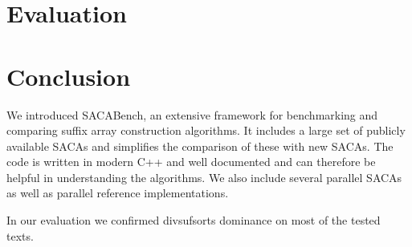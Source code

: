 \section{Evaluation}



\section{Conclusion}

We introduced SACABench, an extensive framework for benchmarking and comparing suffix array construction algorithms.
It includes a large set of publicly available SACAs and simplifies the comparison of these with new SACAs.
The code is written in modern C++ and well documented and can therefore be helpful in understanding the algorithms.
We also include several parallel SACAs as well as parallel reference implementations.

In our evaluation we confirmed divsufsorts dominance on most of the tested texts.

